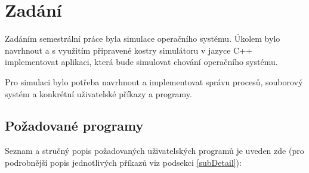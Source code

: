 \documentclass[12pt, a4paper]{article}
\let\oldsection\section
\renewcommand\section{\clearpage\oldsection}
\begin{document}
    \tableofcontents
    \pagebreak

	\section{Zadání}
	Zadáním semestrální práce byla simulace operačního systému. Úkolem bylo navrhnout a s využitím připravené kostry simulátoru v jazyce C++ implementovat aplikaci, která bude simulovat chování operačního systému.
	
	Pro simulaci bylo potřeba navrhnout a implementovat správu procesů, souborový systém a konkrétní uživatelské příkazy a programy. %
	
		\subsection{Požadované programy}
		Seznam a stručný popis požadovaných uživatelských programů je uveden zde (pro podrobnější popis jednotlivých příkazů viz podsekci \ref{subDetail}):
\end{document}
